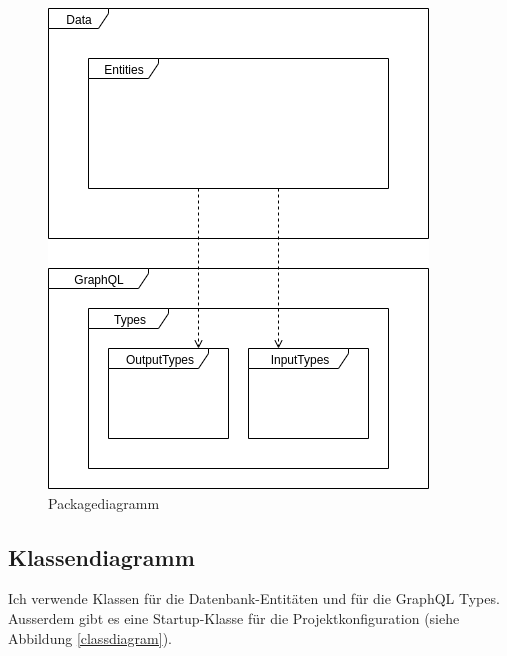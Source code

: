 \documentclass[a4paper, titlepage]{article}
\begin{document}
    \begin{figure}
        \includegraphics[width=\textwidth]{images/Packagediagramm.png}
        \caption{Packagediagramm}
        \label{packages}
    \end{figure}
    
    \subsection{Klassendiagramm}
    Ich verwende Klassen für die Datenbank-Entitäten und für die
    GraphQL Types. Ausserdem gibt es eine Startup-Klasse für die 
    Projektkonfiguration (siehe Abbildung \ref{classdiagram}).
\end{document}
